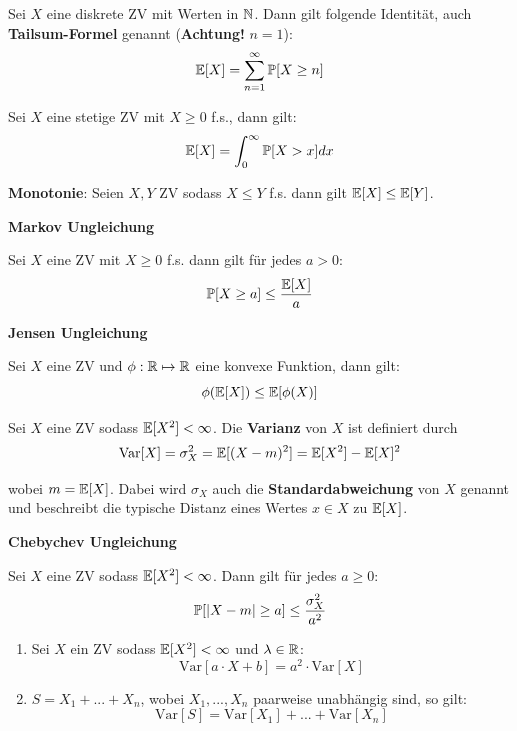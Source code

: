 
Sei $X$ eine diskrete ZV mit Werten in $\mathbb{N}$. Dann gilt folgende Identität, auch \textbf{Tailsum-Formel} genannt (\textbf{Achtung!} $n=1$):
$$\mathbb{E}[X] = \sum_{n=1}^\infty \mathbb{P}[X \geq n]$$

Sei $X$ eine stetige ZV mit $X \geq 0$ f.s., dann gilt:
$$\mathbb{E}[X] = \int_0^\infty \mathbb{P}[X > x] dx$$



\Satz \textbf{Monotonie}: Seien $X,Y$ ZV sodass $X \leq Y$ f.s. dann gilt $\mathbb{E}[X] \leq \mathbb{E}[Y]$. \smallskip

\begin{tcolorbox}
    \textbf{Markov Ungleichung} \smallskip 
    
    Sei $X$ eine ZV mit $X \geq 0$ f.s. dann gilt für jedes $a > 0$:
    $$\mathbb{P}[X \geq a] \leq \frac{\mathbb{E}[X]}{a}$$
\end{tcolorbox}

\begin{tcolorbox}
    \textbf{Jensen Ungleichung} \smallskip 
    
    Sei $X$ eine ZV und $\phi: \mathbb{R} \mapsto \mathbb{R}$ eine konvexe Funktion, dann gilt:
    $$\phi(\mathbb{E}[X]) \leq \mathbb{E}[\phi(X)]$$
\end{tcolorbox}


\vspace*{\fill}
\columnbreak


Sei $X$ eine ZV sodass $\mathbb{E}[X^2] < \infty$. Die \textbf{Varianz} von $X$ ist definiert durch 
$$\text{Var}[X] = \sigma_X^2 = \mathbb{E}[(X-m)^2] = \mathbb{E}[X^2] - \mathbb{E}[X]^2$$

wobei $m = \mathbb{E}[X]$. Dabei wird $\sigma_X$ auch die \textbf{Standardabweichung} von $X$ genannt und beschreibt die typische Distanz eines Wertes $x \in X$ zu $\mathbb{E}[X]$. \medskip

\begin{tcolorbox}
    \textbf{Chebychev Ungleichung} \smallskip
    
    Sei $X$ eine ZV sodass $\mathbb{E}[X^2] < \infty$. Dann gilt für jedes $a \geq 0$:
    $$\mathbb{P}[|X - m| \geq a] \leq \frac{\sigma_X^2}{a^2}$$
\end{tcolorbox}

\Satz
\begin{enumerate}
    \item Sei $X$ ein ZV sodass $\mathbb{E}[X^2] < \infty$ und $\lambda \in \mathbb{R}$: 
    $$\text{Var}[a \cdot X + b] = a^2 \cdot \text{Var}[X]$$
    
    \item $S = X_1 + ... + X_n$, wobei $X_1,...,X_n$ paarweise unabhängig sind, so gilt:
    $$\text{Var}[S] = \text{Var}[X_1] + ... + \text{Var}[X_n]$$
\end{enumerate}


